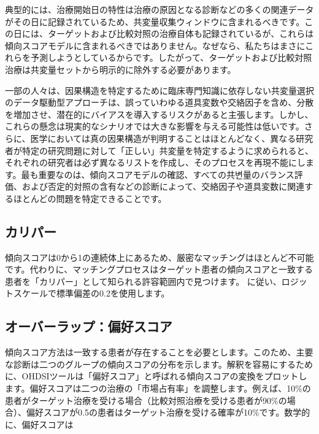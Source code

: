 \documentclass[
  11pt]{book}
\makeatletter
\newenvironment{kframe}{%
\medskip{}
\setlength{\fboxsep}{.8em}
 \def\at@end@of@kframe{}%
 \ifinner\ifhmode%
  \def\at@end@of@kframe{\end{minipage}}%
  \begin{minipage}{\columnwidth}%
 \fi\fi%
 \def\FrameCommand##1{\hskip\@totalleftmargin \hskip-\fboxsep
 \colorbox{myShadeColor}{##1}\hskip-\fboxsep
     \hskip-\linewidth \hskip-\@totalleftmargin \hskip\columnwidth}%
 \MakeFramed {\advance\hsize-\width
   \@totalleftmargin\z@ \linewidth\hsize
   \@setminipage}}%
 {\par\unskip\endMakeFramed%
 \at@end@of@kframe}
\newenvironment{rmdblock}[1]
  {
  \begin{itemize}
  \renewcommand{\labelitemi}{
    \raisebox{-.7\height}[0pt][0pt]{
      {\setkeys{Gin}{width=3em,keepaspectratio}\texttt{[image: images/\#1]}}
    }
  }
  \setlength{\fboxsep}{1em}
  \begin{kframe}
  \item
  }
  {
  \end{kframe}
  \end{itemize}
  }
\newenvironment{rmdimportant}
  {\begin{rmdblock}{important}}
  {\end{rmdblock}}
\theoremstyle{definition}
\theoremstyle{definition}
\theoremstyle{definition}
\theoremstyle{definition}
\theoremstyle{remark}
\makeatother
\begin{document}
\begin{rmdimportant}
典型的には、治療開始日の特性は治療の原因となる診断などの多くの関連データがその日に記録されているため、共変量収集ウィンドウに含まれるべきです。この日には、ターゲットおよび比較対照の治療自体も記録されているが、これらは傾向スコアモデルに含まれるべきではありません。なぜなら、私たちはまさにこれらを予測しようとしているからです。したがって、ターゲットおよび比較対照治療は共変量セットから明示的に除外する必要があります。
\end{rmdimportant}

一部の人々は、因果構造を特定するために臨床専門知識に依存しない共変量選択のデータ駆動型アプローチは、誤っていわゆる道具変数や交絡因子を含め、分散を増加させ、潜在的にバイアスを導入するリスクがあると主張します。しかし、これらの懸念は現実的なシナリオでは大きな影響を与える可能性は低いです。さらに、医学においては真の因果構造が判明することはほとんどなく、異なる研究者が特定の研究問題に対して「正しい」共変量を特定するように求められると、それぞれの研究者は必ず異なるリストを作成し、そのプロセスを再現不能にします。最も重要なのは、傾向スコアモデルの確認、すべての共변量のバランス評価、および否定的対照の含有などの診断によって、交絡因子や道具変数に関連するほとんどの問題を特定できることです。  

\subsection{カリパー}\label{ux30abux30eaux30d1ux30fc}


傾向スコアは0から1の連続体上にあるため、厳密なマッチングはほとんど不可能です。代わりに、マッチングプロセスはターゲット患者の傾向スコアと一致する患者を「カリパー」として知られる許容範囲内で見つけます。\citet{austin_2011} に従い、ロジットスケールで標準偏差の0.2を使用します。

\subsection{オーバーラップ：偏好スコア}\label{ux30aaux30fcux30d0ux30fcux30e9ux30c3ux30d7ux504fux597dux30b9ux30b3ux30a2}


傾向スコア方法は一致する患者が存在することを必要とします。このため、主要な診断は二つのグループの傾向スコアの分布を示します。解釈を容易にするために、OHDSIツールは「偏好スコア」と呼ばれる傾向スコアの変換をプロットします。偏好スコアは二つの治療の「市場占有率」を調整します。例えば、10\%の患者がターゲット治療を受ける場合（比較対照治療を受ける患者が90\%の場合）、偏好スコアが0.5の患者はターゲット治療を受ける確率が10\%です。数学的に、偏好スコアは
\end{document}
